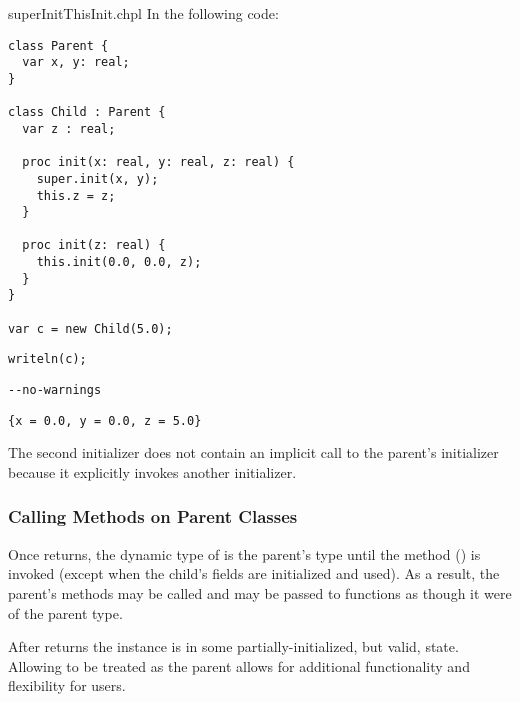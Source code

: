 \begin{chapelexample}{superInitThisInit.chpl}
In the following code:
\begin{chapel}
\begin{verbatim}
class Parent {
  var x, y: real;
}

class Child : Parent {
  var z : real;

  proc init(x: real, y: real, z: real) {
    super.init(x, y);
    this.z = z;
  }

  proc init(z: real) {
    this.init(0.0, 0.0, z);
  }
}

var c = new Child(5.0);
\end{verbatim}
\end{chapel}
\begin{chapelpost}
\begin{verbatim}
writeln(c);
\end{verbatim}
\end{chapelpost}
\begin{chapelcompopts}
\begin{verbatim}
--no-warnings
\end{verbatim}
\end{chapelcompopts}
\begin{chapeloutput}
\begin{verbatim}
{x = 0.0, y = 0.0, z = 5.0}
\end{verbatim}
\end{chapeloutput}
The second initializer does not contain an implicit call to the parent's
initializer because it explicitly invokes another initializer.
\end{chapelexample}

\subsubsection{Calling Methods on Parent Classes}
\label{Calling_Methods_on_Parent_Classes}

Once  returns, the dynamic type of  is the
parent's type until the  method
() is invoked (except when
the child's fields are initialized and used). As a result, the parent's methods
may be called and  may be passed to functions as though it were of
the parent type.

\begin{rationale}
After  returns the instance is in some
partially-initialized, but valid, state. Allowing  to be treated as
the parent allows for additional functionality and flexibility for users.
\end{rationale}

